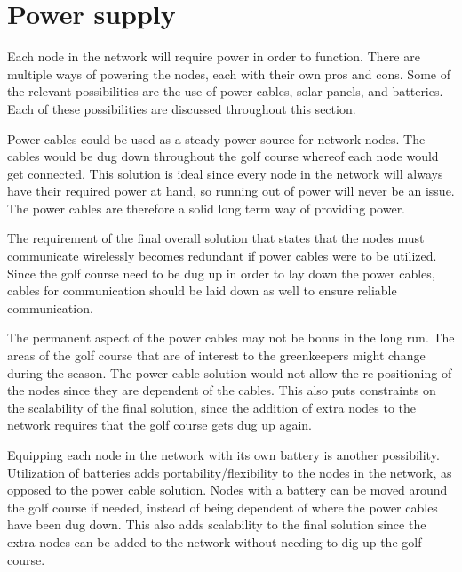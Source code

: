 \section{Power supply}
%


Each node in the network will require power in order to function. There are multiple ways of powering the nodes, each with their own pros and cons. Some of the relevant possibilities are the use of power cables, solar panels, and batteries. Each of these possibilities are discussed throughout this section.


Power cables could be used as a steady power source for network nodes. The cables would be dug down throughout the golf course whereof each node would get connected. This solution is ideal since every node in the network will always have their required power at hand, so running out of power will never be an issue. The power cables are therefore a solid long term way of providing power.

The requirement of the final overall solution that states that the nodes must communicate wirelessly becomes redundant if power cables were to be utilized. Since the golf course need to be dug up in order to lay down the power cables, cables for communication should be laid down as well to ensure reliable communication.

The permanent aspect of the power cables may not be bonus in the long run. The areas of the golf course that are of interest to the greenkeepers might change during the season. The power cable solution would not allow the re-positioning of the nodes since they are dependent of the cables. This also puts constraints on the scalability of the final solution, since the addition of extra nodes to the network requires that the golf course gets dug up again.

Equipping each node in the network with its own battery is another possibility. Utilization of batteries adds portability/flexibility to the nodes in the network, as opposed to the power cable solution. Nodes with a battery can be moved around the golf course if needed, instead of being dependent of where the power cables have been dug down. This also adds scalability to the final solution since the extra nodes can be added to the network without needing to dig up the golf course.

